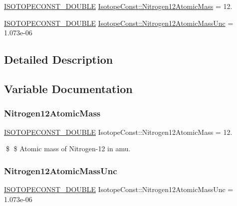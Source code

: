 \begin{DoxyCompactItemize}
\item 
\mbox{\hyperlink{group___isotope_const-_macros_ga8f45a7272ce02c0b4c65c44636ed719a}{I\+S\+O\+T\+O\+P\+E\+C\+O\+N\+S\+T\+\_\+\+D\+O\+U\+B\+LE}} \mbox{\hyperlink{group___isotope_const-_nitrogen-_n12_gaec5a53dff807273ac49eddcdcfbd4f60}{Isotope\+Const\+::\+Nitrogen12\+Atomic\+Mass}} = 12.
\item 
\mbox{\hyperlink{group___isotope_const-_macros_ga8f45a7272ce02c0b4c65c44636ed719a}{I\+S\+O\+T\+O\+P\+E\+C\+O\+N\+S\+T\+\_\+\+D\+O\+U\+B\+LE}} \mbox{\hyperlink{group___isotope_const-_nitrogen-_n12_ga7add34cccb69fd097ad50e4860df87e0}{Isotope\+Const\+::\+Nitrogen12\+Atomic\+Mass\+Unc}} = 1.\+073e-\/06
\end{DoxyCompactItemize}


\subsection{Detailed Description}


\subsection{Variable Documentation}
\mbox{\label{group___isotope_const-_nitrogen-_n12_gaec5a53dff807273ac49eddcdcfbd4f60}} 
\subsubsection{\texorpdfstring{Nitrogen12\+Atomic\+Mass}{Nitrogen12AtomicMass}}
{\footnotesize\ttfamily \mbox{\hyperlink{group___isotope_const-_macros_ga8f45a7272ce02c0b4c65c44636ed719a}{I\+S\+O\+T\+O\+P\+E\+C\+O\+N\+S\+T\+\_\+\+D\+O\+U\+B\+LE}} Isotope\+Const\+::\+Nitrogen12\+Atomic\+Mass = 12.}

\$ \$ Atomic mass of Nitrogen-\/12 in amu. \mbox{\label{group___isotope_const-_nitrogen-_n12_ga7add34cccb69fd097ad50e4860df87e0}} 
\subsubsection{\texorpdfstring{Nitrogen12\+Atomic\+Mass\+Unc}{Nitrogen12AtomicMassUnc}}
{\footnotesize\ttfamily \mbox{\hyperlink{group___isotope_const-_macros_ga8f45a7272ce02c0b4c65c44636ed719a}{I\+S\+O\+T\+O\+P\+E\+C\+O\+N\+S\+T\+\_\+\+D\+O\+U\+B\+LE}} Isotope\+Const\+::\+Nitrogen12\+Atomic\+Mass\+Unc = 1.\+073e-\/06}

